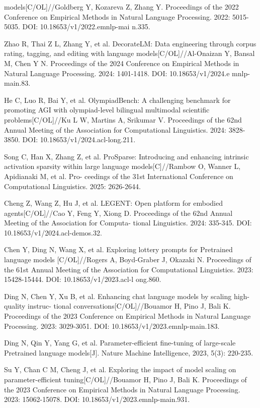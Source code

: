 \begin{resume}
\begin{achievements}
      models[C/OL]//Goldberg Y, Kozareva Z, Zhang Y. Proceedings of the 2022 Conference on
      Empirical Methods in Natural Language Processing. 2022: 5015-5035. DOI: 10.18653/v1/2022.emnlp-mai
      n.335.
      \item Zhao R, Thai Z L, Zhang Y, et al. DecorateLM: Data engineering through corpus rating, tagging,
      and editing with language models[C/OL]//Al-Onaizan Y, Bansal M, Chen Y N. Proceedings of
      the 2024 Conference on Empirical Methods in Natural Language Processing. 2024: 1401-1418. DOI: 10.18653/v1/2024.e
      mnlp-main.83.
      \item He C, Luo R, Bai Y, et al. OlympiadBench: A challenging benchmark for promoting AGI with
      olympiad-level bilingual multimodal scientific problems[C/OL]//Ku L W, Martins A, Srikumar
      V. Proceedings of the 62nd Annual Meeting of the Association for Computational Linguistics.
      2024: 3828-3850. DOI: 10.18653/v1/2024.acl-long.211.
      \item Song C, Han X, Zhang Z, et al. ProSparse: Introducing and enhancing intrinsic activation
      sparsity within large language models[C]//Rambow O, Wanner L, Apidianaki M, et al. Pro-
      ceedings of the 31st International Conference on Computational Linguistics. 2025: 2626-2644.
      \item Cheng Z, Wang Z, Hu J, et al. LEGENT: Open platform for embodied agents[C/OL]//Cao Y,
      Feng Y, Xiong D. Proceedings of the 62nd Annual Meeting of the Association for Computa-
      tional Linguistics. 2024: 335-345. DOI: 10.18653/v1/2024.acl-demos.32.
      \item Chen Y, Ding N, Wang X, et al. Exploring lottery prompts for Pretrained language models
      [C/OL]//Rogers A, Boyd-Graber J, Okazaki N. Proceedings of the 61st Annual Meeting of
      the Association for Computational Linguistics. 2023: 15428-15444. DOI: 10.18653/v1/2023.acl-l
      ong.860.
      \item Ding N, Chen Y, Xu B, et al. Enhancing chat language models by scaling high-quality instruc-
      tional conversations[C/OL]//Bouamor H, Pino J, Bali K. Proceedings of the 2023 Conference
      on Empirical Methods in Natural Language Processing. 2023: 3029-3051. DOI: 10.18653/v1/2023.emnlp-main.183.
      \item Ding N, Qin Y, Yang G, et al. Parameter-efficient fine-tuning of large-scale Pretrained language
      models[J]. Nature Machine Intelligence, 2023, 5(3): 220-235.
      \item Su Y, Chan C M, Cheng J, et al. Exploring the impact of model scaling on parameter-efficient
      tuning[C/OL]//Bouamor H, Pino J, Bali K. Proceedings of the 2023 Conference on Empirical
      Methods in Natural Language Processing. 2023: 15062-15078. DOI: 10.18653/v1/2023.emnlp-main.931.      
   \end{achievements}

\end{resume}
